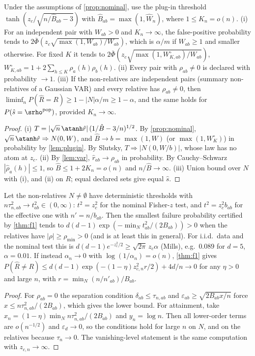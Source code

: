 \begin{proposition}\label{prop:plugin}
Under the assumptions of \cref{prop:nominal}, use the plug-in threshold $\tanh(z_c/\sqrt{n/\hat B_{ab}-3})$ with
$\hat B_{ab}=\max(1,\hat W_n)$, where $1\le K_n=o(n)$.
(i) For an independent pair with $W_{ab}>0$ and $K_n\to\infty$, the false-positive probability tends to
$2\bar\Phi(z_c\sqrt{\max(1,W_{ab})/W_{ab}})$, which is $\alpha/m$ if $W_{ab}\ge1$ and smaller otherwise. For fixed $K$ it
tends to $2\bar\Phi(z_c\sqrt{\max(1,W^\circ_{K,ab})/W_{ab}})$, $W^\circ_{K,ab}=1+2\sum_{h\le K}\rho_a(h)\rho_b(h)$.
(ii) Every pair with $\rho_{ab}\ne0$ is declared with probability $\to1$.
(iii) If the non-relatives are independent pairs (summary non-relatives of a Gaussian VAR) and every relative has
$\rho_{ab}\ne0$, then $\liminf_nP(\hat R=R)\ge1-|N|\alpha/m\ge1-\alpha$, and the same holds for
$P(\hat s=\srho^{\mathrm{pop}})$, provided $K_n\to\infty$.
\end{proposition}
\begin{proof}
(i) $T=|\sqrt n\,\atanh\hat r|\,(1/\hat B-3/n)^{1/2}$. By \cref{prop:nominal}, $\sqrt n\,\atanh\hat r\Rightarrow N(0,W)$,
and $\hat B\to b=\max(1,W)$ (or $\max(1,W^\circ_K)$) in probability by \cref{lem:plugin}. By Slutsky,
$T\Rightarrow|N(0,W/b)|$, whose law has no atom at $z_c$. (ii) By \cref{lem:var}, $\hat r_{ab}\to\rho_{ab}$ in
probability. By Cauchy--Schwarz $|\hat\rho_a(h)|\le1$, so $\hat B\le1+2K_n=o(n)$ and $n/\hat B\to\infty$.
(iii) Union bound over $N$ with (i), and (ii) on $R$; equal declared sets give equal $\hat s$.
\end{proof}

\begin{proposition}\label{prop:f1scope}
Let the non-relatives $N\neq\emptyset$ have deterministic thresholds with $n\tau_{n,ab}^2\to t_{ab}^2\in(0,\infty)$:
$t^2=z_c^2$ for the nominal Fisher-$z$ test, and $t^2=z_c^2b_{ab}$ for the effective one with $n'=n/b_{ab}$. Then the
smallest failure probability certified by \cref{thm:f1} tends to $d(d{-}1)\exp(-\min_Nt_{ab}^2/(2B_{ab}))>0$ when the
relatives have $|\rho|\ge\rho_{\min}>0$ (and is at least this in general). For i.i.d.\ data and the nominal test this
is $d(d{-}1)e^{-z_c^2/2}\ge\sqrt{2\pi}\,z_c\alpha$ (Mills), e.g.\ $0.089$ for $d=5$, $\alpha=0.01$. If instead
$\alpha_n\to0$ with $\log(1/\alpha_n)=o(n)$, \cref{thm:f1} gives
$P(\hat R\ne R)\le d(d{-}1)\exp(-(1-\eta)z_{c,n}^2r/2)+4d/n\to0$ for any $\eta>0$ and large $n$, with
$r=\min_N(n/n'_{ab})/B_{ab}$.
\end{proposition}
\begin{proof}
For $\rho_{ab}=0$ the separation condition $\delta_{ab}\le\tau_{n,ab}$ and $\varepsilon_{ab}\ge\sqrt{2B_{ab}x/n}$ force
$x\le n\tau_{n,ab}^2/(2B_{ab})$, which gives the lower bound. For attainment, take
$x_n=(1-\eta)\min_Nn\tau_{n,ab}^2/(2B_{ab})$ and $y_n=\log n$. Then all lower-order terms are $o(n^{-1/2})$ and
$\varepsilon_d\to0$, so the conditions hold for large $n$ on $N$, and on the relatives because $\tau_n\to0$. The
vanishing-level statement is the same computation with $z_{c,n}\to\infty$.
\end{proof}


